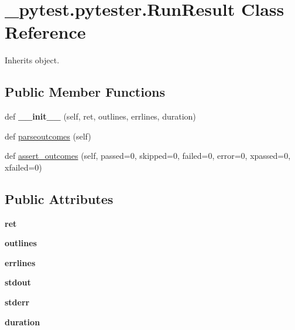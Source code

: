 \hypertarget{class__pytest_1_1pytester_1_1_run_result}{}\section{\+\_\+pytest.\+pytester.\+Run\+Result Class Reference}
\label{class__pytest_1_1pytester_1_1_run_result}


Inherits object.

\subsection*{Public Member Functions}
\begin{DoxyCompactItemize}
\item 
\mbox{\label{class__pytest_1_1pytester_1_1_run_result_a08e9442dcc1592585aef7bd5024ae296}} 
def {\bfseries \+\_\+\+\_\+init\+\_\+\+\_\+} (self, ret, outlines, errlines, duration)
\item 
def \hyperlink{class__pytest_1_1pytester_1_1_run_result_a6b3db0f724dc02c8bbc7a4632dcdbf06}{parseoutcomes} (self)
\item 
def \hyperlink{class__pytest_1_1pytester_1_1_run_result_a035e9bed30ba93d546d0bf751313d192}{assert\+\_\+outcomes} (self, passed=0, skipped=0, failed=0, error=0, xpassed=0, xfailed=0)
\end{DoxyCompactItemize}
\subsection*{Public Attributes}
\begin{DoxyCompactItemize}
\item 
\mbox{\label{class__pytest_1_1pytester_1_1_run_result_a03502a13a36b85392404622a8dc767bb}} 
{\bfseries ret}
\item 
\mbox{\label{class__pytest_1_1pytester_1_1_run_result_a2e6164847b6fdb5b23ba3391ea31f0f7}} 
{\bfseries outlines}
\item 
\mbox{\label{class__pytest_1_1pytester_1_1_run_result_aabc3f6bcd1f0c4809061f0de9840c1eb}} 
{\bfseries errlines}
\item 
\mbox{\label{class__pytest_1_1pytester_1_1_run_result_a69baf54cd2d4e660130bbc796cbc1fab}} 
{\bfseries stdout}
\item 
\mbox{\label{class__pytest_1_1pytester_1_1_run_result_a4a1fab543d69031c4357efed94bff19c}} 
{\bfseries stderr}
\item 
\mbox{\label{class__pytest_1_1pytester_1_1_run_result_ac334624471e7295467dcde967dbefe39}} 
{\bfseries duration}
\end{DoxyCompactItemize}


